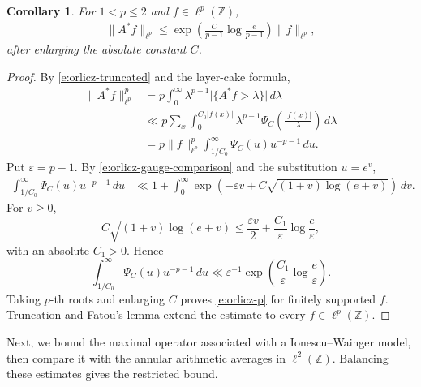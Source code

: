 \documentclass[12pt,reqno]{amsart}
\numberwithin{equation}{section}
\newtheorem{corollary}[equation]{Corollary}
\theoremstyle{definition}
\theoremstyle{remark}
\begin{document}
\begin{corollary}\label{c:orlicz-p}
For \(1<p\leq2\) and \(f\in\ell^p(\mathbb Z)\),
\begin{align}\label{e:orlicz-p}
 \|A^*f\|_{\ell^p}
 \leq
 \exp\left(
 \frac{C}{p-1}\log\frac{e}{p-1}
 \right)\|f\|_{\ell^p},
\end{align}
after enlarging the absolute constant \(C\). 
\end{corollary}

\begin{proof}
By \eqref{e:orlicz-truncated} and the layer-cake formula,
\begin{align*}
 \|A^*f\|_{\ell^p}^p
 &=p\int_0^\infty
 \lambda^{p-1}
 \bigl|\{A^*f>\lambda\}\bigr|\,d\lambda\\
 &\ll
 p\sum_x
 \int_0^{C_0|f(x)|}
 \lambda^{p-1}
 \Psi_C\left(\frac{|f(x)|}{\lambda}\right)\,d\lambda\\
 &=p\|f\|_{\ell^p}^p
 \int_{1/C_0}^\infty
 \Psi_C(u)u^{-p-1}\,du.
\end{align*}
Put \(\varepsilon=p-1\).  By
\eqref{e:orlicz-gauge-comparison} and the substitution \(u=e^v\),
\begin{align*}
 \int_{1/C_0}^\infty
 \Psi_C(u)u^{-p-1}\,du
 &\ll
 1+\int_0^\infty
 \exp\left(
 -\varepsilon v+
 C\sqrt{(1+v)\log(e+v)}
 \right)\,dv.
\end{align*}
For \(v\geq0\),
\[
 C\sqrt{(1+v)\log(e+v)}
 \leq
 \frac{\varepsilon v}{2}
 +\frac{C_1}{\varepsilon}\log\frac{e}{\varepsilon},
\]
with an absolute \(C_1>0\).  Hence
\[
 \int_{1/C_0}^\infty
 \Psi_C(u)u^{-p-1}\,du
 \ll
 \varepsilon^{-1}
 \exp\left(
 \frac{C_1}{\varepsilon}\log\frac{e}{\varepsilon}
 \right).
\]
Taking \(p\)-th roots and enlarging \(C\) proves
\eqref{e:orlicz-p} for finitely supported \(f\).
Truncation and Fatou's lemma extend the estimate to every
\(f\in\ell^p(\mathbb Z)\).
\end{proof}
Next, we bound the maximal operator associated with a
Ionescu--Wainger model, then compare it with the annular
arithmetic averages in \(\ell^2(\mathbb Z)\).
Balancing these estimates gives the restricted bound.
\end{document}
